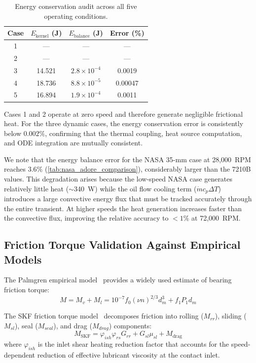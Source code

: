 \documentclass[preprint,12pt]{elsarticle}
\begin{document}
\begin{table}[htbp]
    \centering
    \caption{Energy conservation audit across all five operating conditions.}
    \label{tab:energy}
    \begin{tabular}{@{}cccc@{}}
        \toprule
        Case & $E_{\text{kernel}}$ (J) & $E_{\text{balance}}$ (J) & Error (\%) \\
        \midrule
        1 & --- & --- & --- \\
        2 & --- & --- & --- \\
        3 & 14.521 & $2.8 \times 10^{-4}$ & 0.0019 \\
        4 & 18.736 & $8.8 \times 10^{-5}$ & 0.00047 \\
        5 & 16.894 & $1.9 \times 10^{-4}$ & 0.0011 \\
        \bottomrule
    \end{tabular}
\end{table}

Cases 1 and 2 operate at zero speed and therefore generate negligible frictional heat. For the three dynamic cases, the energy conservation error is consistently below $0.002\%$, confirming that the thermal coupling, heat source computation, and ODE integration are mutually consistent.

We note that the energy balance error for the NASA 35-mm case at 28{,}000~RPM reaches $3.6\%$ (\cref{tab:nasa_adore_comparison}), considerably larger than the 7210B values. This degradation arises because the low-speed NASA case generates relatively little heat ($\sim$340~W) while the oil flow cooling term ($\dot{m}c_p \Delta T$) introduces a large convective energy flux that must be tracked accurately through the entire transient. At higher speeds the heat generation increases faster than the convective flux, improving the relative accuracy to $<1\%$ at 72{,}000~RPM.


\subsection{Friction Torque Validation Against Empirical Models}
\label{sec:palmgren}

The Palmgren empirical model~\cite{Palmgren1959} provides a widely used estimate of bearing friction torque:
\begin{equation}
    M = M_v + M_l = 10^{-7} f_0 (\nu n)^{2/3} d_m^3 + f_1 P_1 d_m
    \label{eq:palmgren}
\end{equation}

The SKF friction torque model~\cite{SKF2018} decomposes friction into rolling ($M_{rr}$), sliding ($M_{sl}$), seal ($M_{seal}$), and drag ($M_{drag}$) components:
\begin{equation}
    M_{\text{SKF}} = \varphi_{ish} \varphi_{rs} G_{rr} + G_{sl} \mu_{sl} + M_{\text{drag}}
    \label{eq:skf}
\end{equation}
where $\varphi_{ish}$ is the inlet shear heating reduction factor that accounts for the speed-dependent reduction of effective lubricant viscosity at the contact inlet.
\end{document}
